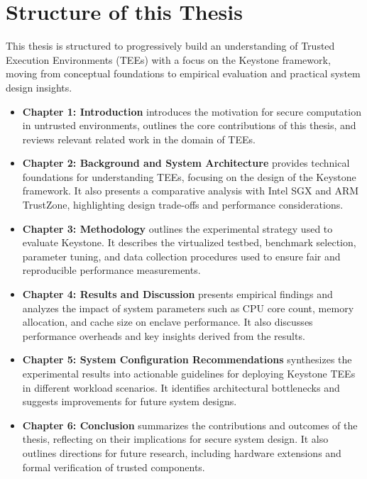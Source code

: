 \section{Structure of this Thesis}

This thesis is structured to progressively build an understanding of Trusted Execution Environments (TEEs) with a focus on the Keystone framework, moving from conceptual foundations to empirical evaluation and practical system design insights.

\begin{itemize}
    \item \textbf{Chapter 1: Introduction} introduces the motivation for secure computation in untrusted environments, outlines the core contributions of this thesis, and reviews relevant related work in the domain of TEEs.
    
    \item \textbf{Chapter 2: Background and System Architecture} provides technical foundations for understanding TEEs, focusing on the design of the Keystone framework. It also presents a comparative analysis with Intel SGX and ARM TrustZone, highlighting design trade-offs and performance considerations.
    
    \item \textbf{Chapter 3: Methodology} outlines the experimental strategy used to evaluate Keystone. It describes the virtualized testbed, benchmark selection, parameter tuning, and data collection procedures used to ensure fair and reproducible performance measurements.
    
    \item \textbf{Chapter 4: Results and Discussion} presents empirical findings and analyzes the impact of system parameters such as CPU core count, memory allocation, and cache size on enclave performance. It also discusses performance overheads and key insights derived from the results.
    
    \item \textbf{Chapter 5: System Configuration Recommendations} synthesizes the experimental results into actionable guidelines for deploying Keystone TEEs in different workload scenarios. It identifies architectural bottlenecks and suggests improvements for future system designs.
    
    \item \textbf{Chapter 6: Conclusion} summarizes the contributions and outcomes of the thesis, reflecting on their implications for secure system design. It also outlines directions for future research, including hardware extensions and formal verification of trusted components.
\end{itemize}